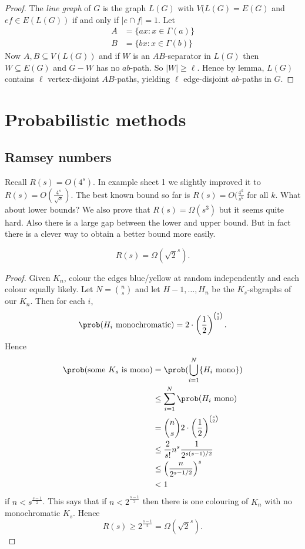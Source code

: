 \documentclass[a4paper]{article}
\renewcommand{\P}{\prob} %
\begin{document}
\begin{proof}
  The \emph{line graph} of \(G\) is the graph \(L(G)\) with \(V(L(G) = E(G)\) and \(ef \in E(L(G))\) if and only if \(|e \cap f| = 1\). Let
  \begin{align*}
    A &= \{ax: x \in \Gamma(a)\} \\
    B &= \{bx: x \in \Gamma(b)\}
  \end{align*}
  Now \(A, B \subseteq V(L(G))\) and if \(W\) is an \(AB\)-separator in \(L(G)\) then \(W \subseteq E(G)\) and \(G - W\) has no \(ab\)-path. So \(|W| \geq \ell\). Hence by lemma, \(L(G)\) contains \(\ell\) vertex-disjoint \(AB\)-paths, yielding \(\ell\) edge-disjoint \(ab\)-paths in \(G\).
\end{proof}

\section{Probabilistic methods}

\subsection{Ramsey numbers}

Recall \(R(s) = O(4^s)\). In example sheet 1 we slightly improved it to \(R(s) = O(\frac{4^s}{\sqrt s})\). The best known bound so far is \(R(s) = O(\frac{4^k}{s^k}\) for all \(k\). What about lower bounds? We also prove that \(R(s) = \Omega(s^3)\) but it seems quite hard. Also there is a large gap between the lower and upper bound. But in fact there is a clever way to obtain a better bound more easily.

\begin{theorem}[Erdos]
  \[
    R(s) = \Omega(\sqrt 2^s).
  \]
\end{theorem}

\begin{proof}
  Given \(K_n\), colour the edges blue/yellow at random independently and each colour equally likely. Let \(N = \binom{n}{s}\) and let \(H-1, \dots, H_n\) be the \(K_s\)-sbgraphs of our \(K_n\). Then for each \(i\),
  \[
    \P(H_i \text{ monochromatic}) = 2 \cdot \left(\frac{1}{2} \right)^{\binom{s}{2}}.
  \]
  Hence
  \begin{align*}
    \P(\text{some \(K_s\) is mono})
    &= \P(\bigcup_{i = 1}^N \{H_i \text{ mono}\}) \\
    &\leq \sum_{i = 1}^N \P(H_i \text{ mono}) \\
    &= \binom{n}{s} 2 \cdot \left(\frac{1}{2} \right)^{\binom{s}{2}} \\
    &\leq \frac{2}{s!} n^s \frac{1}{2^{s(s - 1)/2}} \\
    &\leq \left(\frac{n}{2^{s - 1/2}}\right)^s \\
    & < 1
  \end{align*}
  if \(n < s^{\frac{s - 1}{2}}\). This says that if \(n < 2^{\frac{s - 1}{2}}\) then there is one colouring of \(K_n\) with no monochromatic \(K_s\). Hence
  \[
    R(s) \geq 2^{\frac{s - 1}{2}} = \Omega(\sqrt 2^s).
  \]
\end{proof}
\end{document}
